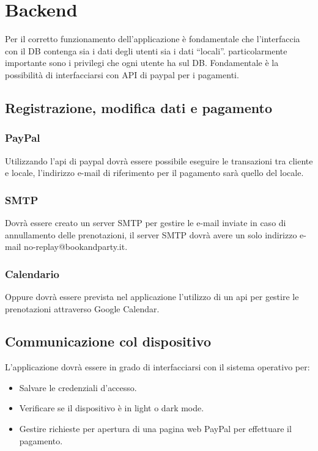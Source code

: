 \chapter{Backend}
Per il corretto funzionamento dell'applicazione è fondamentale che l'interfaccia con il DB 
contenga sia i dati degli utenti sia i dati “locali”. particolarmente importante sono i privilegi
che ogni utente ha sul DB. Fondamentale  è la possibilità di interfacciarsi con API di paypal per 
i pagamenti.

\section{Registrazione, modifica dati e pagamento}
\subsection{PayPal}
Utilizzando l’api di paypal dovrà essere possibile eseguire le transazioni tra cliente e locale, 
l’indirizzo e-mail di riferimento per il pagamento sarà quello del locale.

\subsection{SMTP}
Dovrà essere creato un server SMTP per gestire le e-mail inviate in caso di annullamento delle 
prenotazioni, il server SMTP dovrà avere un solo indirizzo e-mail no-replay@bookandparty.it.

\subsection{Calendario}
Oppure dovrà essere prevista nel applicazione l'utilizzo di un api per gestire le prenotazioni 
attraverso Google Calendar.

\section{Communicazione col dispositivo}
L'applicazione dovrà essere in grado di interfacciarsi con il sistema operativo per:
\begin{itemize}
    \item Salvare le credenziali d'accesso.
    \item Verificare se il dispositivo è in light o dark mode.
    \item Gestire richieste per apertura di una pagina web PayPal per effettuare il pagamento. 
\end{itemize}

